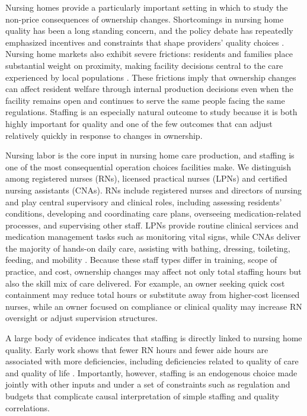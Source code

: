 \documentclass[12pt]{article}
\begin{document}
Nursing homes provide a particularly important setting in which to study the non-price consequences of ownership changes. Shortcomings in nursing home quality has been a long standing concern, and the policy debate has repeatedly emphasized incentives and constraints that shape providers’ quality choices \citep{hackmann_2019}. Nursing home markets also exhibit severe frictions: residents and families place substantial weight on proximity, making facility decisions central to the care experienced by local populations \citep{gupta_et_al_2021}. These frictions imply that ownership changes can affect resident welfare through internal production decisions even when the facility remains open and continues to serve the same people facing the same regulations. Staffing is an especially natural outcome to study because it is both highly important for quality and one of the few outcomes that can adjust relatively quickly in response to changes in ownership.

Nursing labor is the core input in nursing home care production, and staffing is one of the most consequential operation choices facilities make. We distinguish among registered nurses (RNs), licensed practical nurses (LPNs) and certified nursing assistants (CNAs). RNs include registered nurses and directors of nursing and play central supervisory and clinical roles, including assessing residents’ conditions, developing and coordinating care plans, overseeing medication-related processes, and supervising other staff. LPNs provide routine clinical services and medication management tasks such as monitoring vital signs, while CNAs deliver the majority of hands-on daily care, assisting with bathing, dressing, toileting, feeding, and mobility \citep{lin_2014}. Because these staff types differ in training, scope of practice, and cost, ownership changes may affect not only total staffing hours but also the skill mix of care delivered. For example, an owner seeking quick cost containment may reduce total hours or substitute away from higher-cost licensed nurses, while an owner focused on compliance or clinical quality may increase RN oversight or adjust supervision structures.

A large body of evidence indicates that staffing is directly linked to nursing home quality. Early work shows that fewer RN hours and fewer aide hours are associated with more deficiencies, including deficiencies related to quality of care and quality of life \citep{harrington_et_al_2000}. Importantly, however, staffing is an endogenous choice made jointly with other inputs and under a set of constraints such as regulation and budgets that complicate causal interpretation of simple staffing and quality correlations. 
\end{document}
